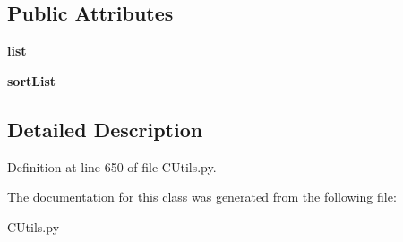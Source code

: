 \subsection*{Public Attributes}
\begin{DoxyCompactItemize}
\item 
\mbox{\label{class_c_utils_1_1_utils_1_1_u_i_1_1_controls_1_1_lst_box_a6bbb80367a84ef6bc36dcf82df1fea55}} 
{\bfseries list}
\item 
\mbox{\label{class_c_utils_1_1_utils_1_1_u_i_1_1_controls_1_1_lst_box_a05b7a6fa81010873e4d6d46d3f7c1800}} 
{\bfseries sort\+List}
\end{DoxyCompactItemize}


\subsection{Detailed Description}


Definition at line 650 of file C\+Utils.\+py.



The documentation for this class was generated from the following file\+:\begin{DoxyCompactItemize}
\item 
C\+Utils.\+py\end{DoxyCompactItemize}

